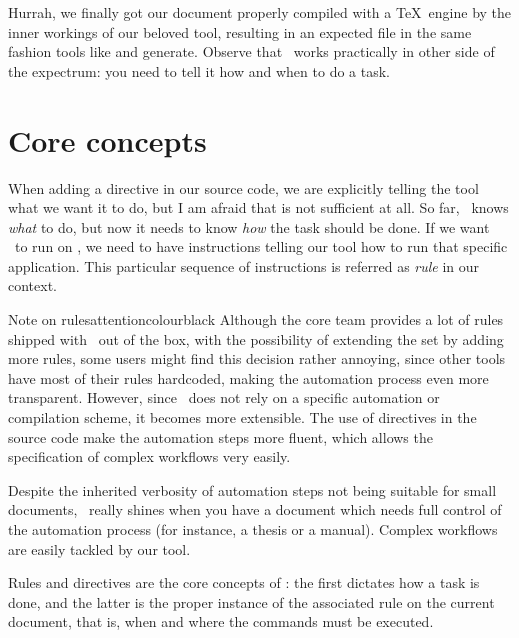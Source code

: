 Hurrah, we finally got our document properly compiled with a \TeX\ engine by the inner workings of our beloved tool, resulting in an expected  file in the same fashion tools like  and  generate. Observe that \arara\ works practically in other side of the expectrum: you need to tell it how and when to do a task.

\section{Core concepts}
\label{sec:coreconcepts}

When adding a directive in our source code, we are explicitly telling the tool what we want it to do, but I am afraid that is not sufficient at all. So far, \arara\ knows \emph{what} to do, but now it needs to know \emph{how} the task should be done. If we want \arara\ to run  on , we need to have instructions telling our tool how to run that specific application. This particular sequence of instructions is referred as \emph{rule} in our context. 

\begin{messagebox}{Note on rules}{attentioncolour}{\icattention}{black}
Although the core team provides a lot of rules shipped with \arara\ out of the box, with the possibility of extending the set by adding more rules, some users might find this decision rather annoying, since other tools have most of their rules hardcoded, making the automation process even more transparent. However, since \arara\ does not rely on a specific automation or compilation scheme, it becomes more extensible. The use of directives in the source code make the automation steps more fluent, which allows the specification of complex workflows very easily.
\end{messagebox}

Despite the inherited verbosity of automation steps not being suitable for small documents, \arara\ really shines when you have a document which needs full control of the automation process (for instance, a thesis or a manual). Complex workflows are easily tackled by our tool.

Rules and directives are the core concepts of \arara: the first dictates how a task is done, and the latter is the proper instance of the associated rule on the current document, that is, when and where the commands must be executed.

